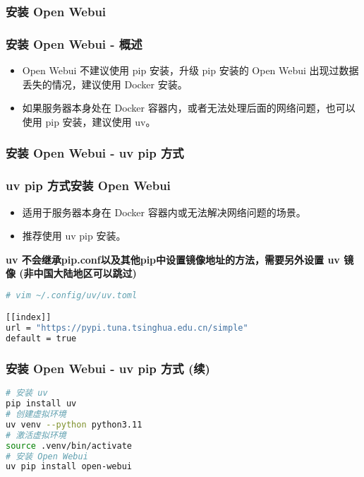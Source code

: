 \begin{frame}[fragile]
	\frametitle{安装 Open Webui}
	\subsubsection{安装 Open Webui - 概述}
	\begin{itemize}
		\item Open Webui 不建议使用 pip 安装，升级 pip 安装的 Open Webui 出现过数据丢失的情况，建议使用 Docker 安装。
		\item 如果服务器本身处在 Docker 容器内，或者无法处理后面的网络问题，也可以使用 pip 安装，建议使用 uv。
	\end{itemize}
\end{frame}

\begin{frame}[fragile]
	\frametitle{安装 Open Webui - uv pip 方式}
	\subsubsection{uv pip 方式安装 Open Webui}
	\begin{itemize}
		\item 适用于服务器本身在 Docker 容器内或无法解决网络问题的场景。
		\item 推荐使用 uv pip 安装。
	\end{itemize}
	\textbf{uv 不会继承pip.conf以及其他pip中设置镜像地址的方法，需要另外设置 uv 镜像 (非中国大陆地区可以跳过)}

	\begin{lstlisting}[language=bash]
# vim ~/.config/uv/uv.toml

[[index]]
url = "https://pypi.tuna.tsinghua.edu.cn/simple"
default = true
\end{lstlisting}
\end{frame}

\begin{frame}[fragile]
	\frametitle{安装 Open Webui - uv pip 方式 (续)}
	\begin{lstlisting}[language=bash]
# 安装 uv
pip install uv
# 创建虚拟环境
uv venv --python python3.11
# 激活虚拟环境
source .venv/bin/activate
# 安装 Open Webui
uv pip install open-webui
\end{lstlisting}
\end{frame}

